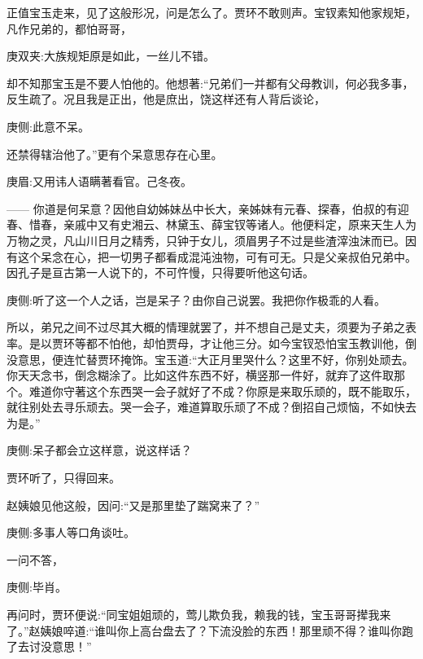 \begin{parag}
    正值宝玉走来，见了这般形况，问是怎么了。贾环不敢则声。宝钗素知他家规矩，凡作兄弟的，都怕哥哥，\begin{note}庚双夹:大族规矩原是如此，一丝儿不错。\end{note}却不知那宝玉是不要人怕他的。他想著:“兄弟们一并都有父母教训，何必我多事，反生疏了。况且我是正出，他是庶出，饶这样还有人背后谈论，\begin{note}庚侧:此意不呆。\end{note}还禁得辖治他了。”更有个呆意思存在心里。\begin{note}庚眉:又用讳人语瞒著看官。己冬夜。\end{note}—— 你道是何呆意？因他自幼姊妹丛中长大，亲姊妹有元春、探春，伯叔的有迎春、惜春，亲戚中又有史湘云、林黛玉、薛宝钗等诸人。他便料定，原来天生人为万物之灵，凡山川日月之精秀，只钟于女儿，须眉男子不过是些渣滓浊沫而已。因有这个呆念在心，把一切男子都看成混沌浊物，可有可无。只是父亲叔伯兄弟中。因孔子是亘古第一人说下的，不可忤慢，只得要听他这句话。\begin{note}庚侧:听了这一个人之话，岂是呆子？由你自己说罢。我把你作极乖的人看。\end{note}所以，弟兄之间不过尽其大概的情理就罢了，并不想自己是丈夫，须要为子弟之表率。是以贾环等都不怕他，却怕贾母，才让他三分。如今宝钗恐怕宝玉教训他，倒没意思，便连忙替贾环掩饰。宝玉道:“大正月里哭什么？这里不好，你别处顽去。你天天念书，倒念糊涂了。比如这件东西不好，横竖那一件好，就弃了这件取那个。难道你守著这个东西哭一会子就好了不成？你原是来取乐顽的，既不能取乐，就往别处去寻乐顽去。哭一会子，难道算取乐顽了不成？倒招自己烦恼，不如快去为是。”\begin{note}庚侧:呆子都会立这样意，说这样话？\end{note}贾环听了，只得回来。
\end{parag}


\begin{parag}
    赵姨娘见他这般，因问:“又是那里垫了踹窝来了？”\begin{note}庚侧:多事人等口角谈吐。\end{note}一问不答，\begin{note}庚侧:毕肖。\end{note}再问时，贾环便说:“同宝姐姐顽的，莺儿欺负我，赖我的钱，宝玉哥哥撵我来了。”赵姨娘啐道:“谁叫你上高台盘去了？下流没脸的东西！那里顽不得？谁叫你跑了去讨没意思！”
\end{parag}


